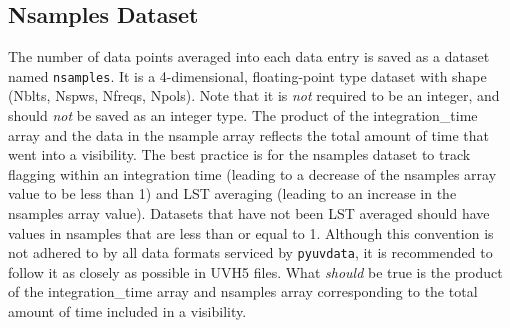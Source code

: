 \documentclass[11pt, oneside]{article}
\begin{document}
\subsection{Nsamples Dataset}
\label{sec:nsamples}
The number of data points averaged into each data entry is saved as a dataset
named \verb+nsamples+. It is a 4-dimensional, floating-point type dataset with
shape (Nblts, Nspws, Nfreqs, Npols). Note that it is \textit{not} required to be
an integer, and should \textit{not} be saved as an integer type. The product of
the integration\_time array and the data in the nsample array reflects the total
amount of time that went into a visibility. The best practice is for the
nsamples dataset to track flagging within an integration time (leading to a
decrease of the nsamples array value to be less than 1) and LST averaging
(leading to an increase in the nsamples array value). Datasets that have not
been LST averaged should have values in nsamples that are less than or equal to
1. Although this convention is not adhered to by all data formats serviced by
\verb+pyuvdata+, it is recommended to follow it as closely as possible in UVH5
files. What \textit{should} be true is the product of the integration\_time
array and nsamples array corresponding to the total amount of time included in a
visibility.

\newpage
\end{document}

